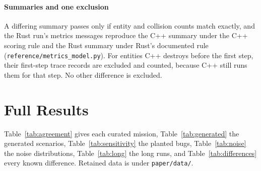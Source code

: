 \documentclass[conference]{IEEEtran}
\begin{document}
\paragraph{Summaries and one exclusion}
A differing summary passes only if entity and collision counts match exactly,
and the Rust run's metrics messages reproduce the C++ summary under the C++
scoring rule and the Rust summary under Rust's documented rule
(\texttt{reference/metrics\_model.py}). For entities C++ destroys before
the first step, their first-step trace records are excluded and counted, because
C++ still runs them for that step. No other difference is excluded.

\section{Full Results}
\label{app:results}

Table~\ref{tab:agreement} gives each curated mission, Table~\ref{tab:generated}
the generated scenarios, Table~\ref{tab:sensitivity} the planted bugs,
Table~\ref{tab:noise} the noise distributions, Table~\ref{tab:long} the long
runs, and Table~\ref{tab:differences} every known difference. Retained data is
under \texttt{paper/data/}.






\end{document}
